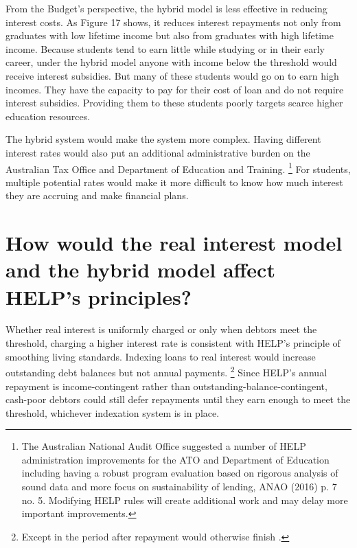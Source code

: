 \documentclass[embargoed]{grattan}
\begin{document}
From the Budget's perspective, the hybrid model is less effective in reducing interest costs.
As Figure 17 shows, it reduces interest repayments not only from graduates with low lifetime income but also from graduates with high lifetime income.
Because students tend to earn little while studying or in their early career, under the hybrid model anyone with income below the threshold would receive interest subsidies.
But many of these students would go on to earn high incomes.
They have the capacity to pay for their cost of loan and do not require interest subsidies.
Providing them to these students poorly targets scarce higher education resources.

The hybrid system would make the system more complex.
Having different interest rates would also put an additional administrative burden on the Australian Tax Office and Department of Education and Training.%
\footnote{The Australian National Audit Office suggested a number of HELP administration improvements for the \gls{ATO} and Department of Education including having a robust program evaluation based on rigorous analysis of sound data and more focus on sustainability of lending, ANAO (2016) p. 7 no. 5.
Modifying HELP rules will create additional work and may delay more important improvements.} For students, multiple potential rates would make it more difficult to know how much interest they are accruing and make financial plans.

\section{How would the real interest model and the hybrid model affect HELP's principles?}\label{how-would-the-real-interest-model-and-the-hybrid-model-affect-helps-principles}

Whether real interest is uniformly charged or only when debtors meet the threshold, charging a higher interest rate is consistent with HELP's principle of smoothing living standards.
Indexing loans to real interest would increase outstanding debt balances but not annual payments.%
\footnote{Except in the period after repayment would otherwise finish .} Since HELP's annual repayment is income-contingent rather than outstanding-balance-contingent, cash-poor debtors could still defer repayments until they earn enough to meet the threshold, whichever indexation system is in place.
\end{document}

